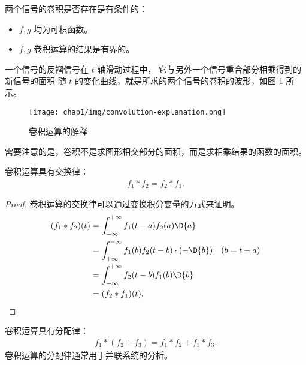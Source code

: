\begin{remark}
    两个信号的卷积是否存在是有条件的：
    \begin{itemize}
        \item $f, g$ 均为可积函数。
        \item $f, g$ 卷积运算的结果是有界的。
    \end{itemize}
\end{remark}

\begin{note}
    一个信号的反褶信号在 $t$ 轴滑动过程中，
    它与另外一个信号重合部分相乘得到的新信号的面积
    随 $t$ 的变化曲线，就是所求的两个信号的卷积的波形，如图 \ref{fig:convolution-explanation} 所示。
    \begin{figure}[H]
        \centering
        \texttt{[image: chap1/img/convolution-explanation.png]}
        \caption{卷积运算的解释}
        \label{fig:convolution-explanation}
    \end{figure}
    需要注意的是，卷积不是求图形相交部分的面积，而是求相乘结果的函数的面积。
\end{note}

\begin{property}[卷积运算的交换律]
    卷积运算具有交换律：
    \begin{align*}
        f_1 * f_2 = f_2 * f_1.
    \end{align*}
\end{property}

\begin{proof}
    卷积运算的交换律可以通过变换积分变量的方式来证明。
    \begin{align*}
        (f_1 * f_2)(t) & = \int_{-\infty}^{+\infty}f_1(t - a)f_2(a)\D{a} \\
        & = \int_{+\infty}^{-\infty}f_1(b)f_2(t - b)\cdot (-\D{b}) \quad (b = t - a) \\
        & = \int_{-\infty}^{+\infty}f_2(t - b)f_1(b)\D{b} \\
        & = (f_2 * f_1)(t).
    \end{align*}
\end{proof}

\begin{property}[卷积运算的分配律]
    卷积运算具有分配律：
    \begin{align*}
        f_1 * (f_2 + f_3) = f_1 * f_2 + f_1 * f_3.
    \end{align*}
    卷积运算的分配律通常用于并联系统的分析。
\end{property}

